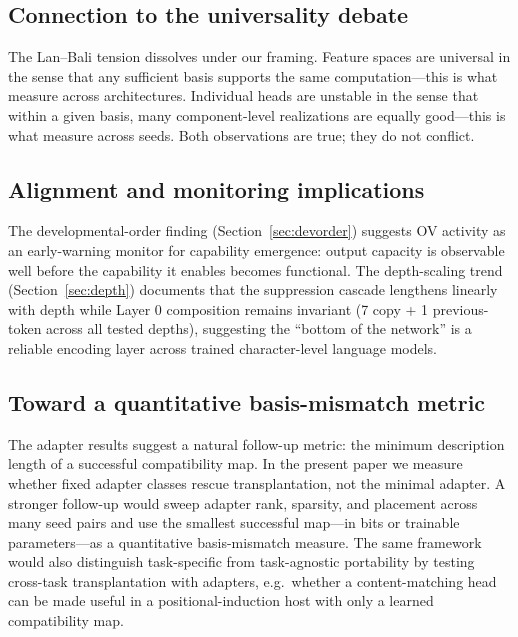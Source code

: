 \documentclass[final]{article}
\begin{document}
\subsection{Connection to the universality debate}

The Lan--Bali tension dissolves under our framing. Feature spaces are universal
in the sense that any sufficient basis supports the same computation---this is
what \citet{lan2025universal} measure across architectures. Individual heads are
unstable in the sense that within a given basis, many component-level
realizations are equally good---this is what \citet{bali2026headstability}
measure across seeds. Both observations are true; they do not conflict.

\subsection{Alignment and monitoring implications}

The developmental-order finding (Section~\ref{sec:devorder}) suggests OV
activity as an early-warning monitor for capability emergence: output capacity
is observable well before the capability it enables becomes functional. The
depth-scaling trend (Section~\ref{sec:depth}) documents that the suppression
cascade lengthens linearly with depth while Layer 0 composition remains
invariant (7 copy + 1 previous-token across all tested depths), suggesting the
``bottom of the network'' is a reliable encoding layer across trained character-level
language models.

\subsection{Toward a quantitative basis-mismatch metric}

The adapter results suggest a natural follow-up metric: the minimum description
length of a successful compatibility map. In the present paper we measure
whether fixed adapter classes rescue transplantation, not the minimal adapter.
A stronger follow-up would sweep adapter rank, sparsity, and placement across
many seed pairs and use the smallest successful map---in bits or trainable
parameters---as a quantitative basis-mismatch measure. The same framework would
also distinguish task-specific from task-agnostic portability by testing
cross-task transplantation with adapters, e.g.\ whether a content-matching head
can be made useful in a positional-induction host with only a learned
compatibility map.
\end{document}
